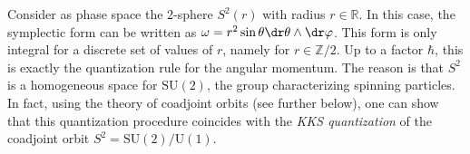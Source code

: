     \begin{example}
        Consider as phase space the 2-sphere $S^2(r)$ with radius $r\in\mathbb{R}$. In this case, the symplectic form can be written as $\omega=r^2\sin\theta\dr\theta\wedge\dr\varphi$. This form is only integral for a discrete set of values of $r$, namely for $r\in\mathbb{Z}/2$. Up to a factor $\hbar$, this is exactly the quantization rule for the angular momentum. The reason is that $S^2$ is a homogeneous space for $\mathrm{SU}(2)$, the group characterizing spinning particles. In fact, using the theory of coadjoint orbits (see further below), one can show that this quantization procedure coincides with the \textit{KKS quantization} of the coadjoint orbit $S^2=\mathrm{SU}(2)/\mathrm{U}(1)$.
    \end{example}

